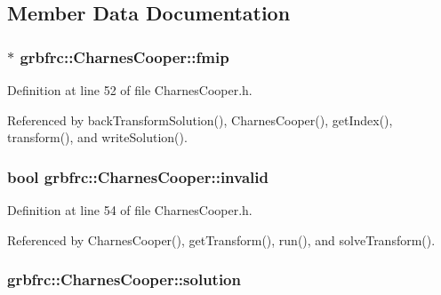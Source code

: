 \subsection{Member Data Documentation}
\subsubsection[{\texorpdfstring{fmip}{fmip}}]{$\ast$ grbfrc\+::\+Charnes\+Cooper\+::fmip\hspace{0.3cm}{\ttfamily [private]}}\hypertarget{classgrbfrc_1_1CharnesCooper_a107817ee13698551fae6263c8849f730}{}\label{classgrbfrc_1_1CharnesCooper_a107817ee13698551fae6263c8849f730}


Definition at line 52 of file Charnes\+Cooper.\+h.



Referenced by back\+Transform\+Solution(), Charnes\+Cooper(), get\+Index(), transform(), and write\+Solution().

\subsubsection[{\texorpdfstring{invalid}{invalid}}]{\setlength{\rightskip}{0pt plus 5cm}bool grbfrc\+::\+Charnes\+Cooper\+::invalid\hspace{0.3cm}{\ttfamily [private]}}\hypertarget{classgrbfrc_1_1CharnesCooper_a4aaa78ed310e18365a3ec113079b3cd2}{}\label{classgrbfrc_1_1CharnesCooper_a4aaa78ed310e18365a3ec113079b3cd2}


Definition at line 54 of file Charnes\+Cooper.\+h.



Referenced by Charnes\+Cooper(), get\+Transform(), run(), and solve\+Transform().

\subsubsection[{\texorpdfstring{solution}{solution}}]{ grbfrc\+::\+Charnes\+Cooper\+::solution\hspace{0.3cm}{\ttfamily [private]}}\hypertarget{classgrbfrc_1_1CharnesCooper_a5c04547132dbf45edebaefe0d1ede08a}{}\label{classgrbfrc_1_1CharnesCooper_a5c04547132dbf45edebaefe0d1ede08a}



